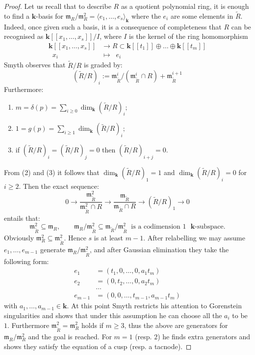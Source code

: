 \documentclass[11pt]{amsart}
\renewcommand{\k}{\mathbf k}
\renewcommand{\to}{\rightarrow}
\theoremstyle{plain}
\theoremstyle{definition}
\begin{document}
\begin{proof}
Let us recall that to describe $R$ as a quotient polynomial ring, it is enough to find a $\k$-basis for $\mathfrak{m}_R/\mathfrak{m}^2_R=\langle e_1,\ldots, e_s\rangle_{\k}$ where the $e_i$ are some elements in $\widetilde{R}.$ Indeed, once given such a basis, it is a consequence of completeness that $R$ can be recognised as $\k[[x_1,\ldots, x_s]]/I$, where $I$ is the kernel of the ring homomorphism
\begin{align*}\label{eq:singularity}
\k[[x_1,\ldots, x_s]]&\rightarrow R\subset \k[[t_1]]\oplus\ldots\oplus \k[[t_m]]\\
\;\;x_i\;\; &\mapsto \;\; e_i\;\;
\end{align*}
Smyth observes that $\widetilde R/R$ is graded by:
\[ (\widetilde R/R)_i:=\mathfrak m_{\widetilde R}^i/(\mathfrak m_{\widetilde R}^i\cap R)+\mathfrak m_{\widetilde R}^{i+1}\]
Furthermore:
\begin{enumerate}
\item $m=\delta(p)=\sum_{i\geq 0}\dim_\k(\widetilde R/R)_i;$
\item $1=g(p)=\sum_{i\geq 1}\dim_\k(\widetilde R/R)_i;$
\item if $(\widetilde R/R)_i=(\widetilde R/R)_j=0$ then $(\widetilde R/R)_{i+j}=0$.
\end{enumerate}
From (2) and (3) it follows that $\dim_\k(\widetilde R/R)_1=1$ and $\dim_\k(\widetilde R/R)_i=0$ for $i\geq 2$. Then the exact sequence:
\[ 0\to \frac{\mathfrak m_{\widetilde R}^2}{\mathfrak m_{\widetilde R}^2\cap R}\to\frac{\mathfrak m_{\widetilde R}}{\mathfrak m_{\widetilde R}\cap R}\to (\widetilde R/R)_1\to 0\]
entails that:
\[\mathfrak{m}^2_{\widetilde{R}}\subseteq \mathfrak m_R,\qquad \mathfrak{m}_R/\mathfrak{m}^2_{\widetilde{R}}\subseteq \mathfrak{m}_{\widetilde{R}}/\mathfrak{m}^2_{\widetilde{R}}\;\;\text{is a codimension $1$ $\k$-subspace}.\]
Obviously $\mathfrak{m}^2_{R}\subseteq\mathfrak{m}^2_{\widetilde{R}}$. Hence $s$ is at least $m-1$. After relabelling we may assume $e_1,\ldots, e_{m-1}$ generate $\mathfrak{m}_R/\mathfrak{m}^2_{\widetilde{R}}$, and after Gaussian elimination they take the following form:
\begin{align*}
e_1&= (t_1, 0, \ldots, 0, a_1 t_m) \\
e_2&= (0, t_2, \ldots, 0, a_2 t_m) \\
 & \ldots \\
e_{m-1} &= (0, 0,\ldots, t_{m-1}, a_{m-1}t_m)
\end{align*}
with $a_{1}, \ldots, a_{m-1}\in \k.$ At this point Smyth restricts his attention to Gorenstein singularities and shows that under this assumption he can choose all the $a_i$ to be $1$. Furthermore $\mathfrak{m}^2_{\widetilde{R}}=\mathfrak{m}^2_{R}$ holds if $m\geq 3$, thus the above are generators for $\mathfrak{m}_R/\mathfrak{m}^2_R$ and the goal is reached. For $m=1$ (resp. $2$) he finds extra generators and shows they satisfy the equation of a cusp (resp. a tacnode).


\end{proof}
\end{document}
